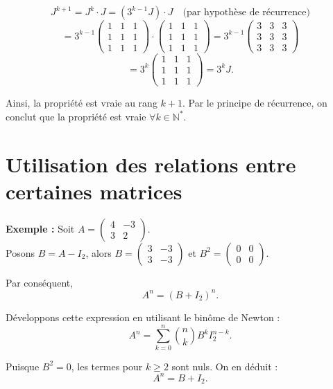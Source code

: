 \[
J^{k+1} = J^k \cdot J = (3^{k-1} J) \cdot J \quad \text{(par hypothèse de récurrence)} 
\]
\[
= 3^{k-1}
\begin{pmatrix}
1 & 1 & 1\\
1 & 1 & 1\\
1 & 1 & 1
\end{pmatrix}
\cdot 
\begin{pmatrix}
1 & 1 & 1\\
1 & 1 & 1\\
1 & 1 & 1
\end{pmatrix}
= 3^{k-1}
\begin{pmatrix}
3 & 3 & 3\\
3 & 3 & 3\\
3 & 3 & 3
\end{pmatrix}
\]
\[
= 3^k 
\begin{pmatrix}
1 & 1 & 1\\
1 & 1 & 1\\
1 & 1 & 1
\end{pmatrix} = 3^k J.
\]

Ainsi, la propriété est vraie au rang $k+1$. Par le principe de récurrence, on conclut que la propriété est vraie $\forall k \in \mathbb{N}^*$.

\section{Utilisation des relations entre certaines matrices}


\textbf{Exemple :} Soit $A = 
\begin{pmatrix}
4 & -3\\
3 & 2
\end{pmatrix}
$.\\

Posons $B = A - I_2$, alors $B = 
\begin{pmatrix}
3 & -3\\
3 & -3
\end{pmatrix}
$ et $B^2 = 
\begin{pmatrix}
0 & 0\\
0 & 0
\end{pmatrix}
$.

Par conséquent, 
\[
A^n = (B + I_2)^n.
\]

Développons cette expression en utilisant le binôme de Newton :
\[
A^n = \sum_{k=0}^n \binom{n}{k} B^k I_2^{n-k}.
\]

Puisque $B^2 = 0$, les termes pour $k \geq 2$ sont nuls. On en déduit :
\[
A^n = B + I_2.
\]


